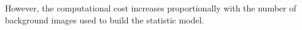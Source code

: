\documentclass{article}
\begin{document}
	However, the computational cost increases proportionally with the number of background images used to build the statistic model.

	\begin{figure}[H]
		  \centering
		  \hspace{0.1cm}

\end{figure}
\end{document}
